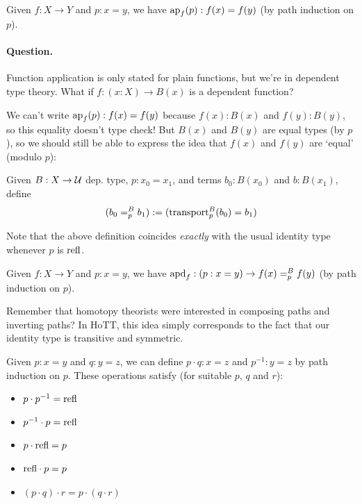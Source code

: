 \documentclass[10pt,oneside,leqno,openright]{memoir}
\begin{document}
\begin{example}
  Given $f :X \to Y$ and $p:x=y$, we have $\operatorname{ap}_f(p) : f(x) = f(y)$ (by path induction on $p$).
\end{example}

\paragraph{Question.} Function application is only stated for plain functions, but we're in dependent type theory. What if $f : (x:X) \to B(x)$ is a dependent function?

We can't write $\operatorname{ap}_f(p) : f(x) = f(y)$ because $f(x) : B(x)$ and $f(y):B(y)$, so this equality doesn't type check! But $B(x)$ and $B(y)$ are equal types (by $p$), so we should still be able to express the idea that $f(x)$ and $f(y)$ are `equal' (modulo $p$):

\begin{definition}
  Given $B: X \to \mathcal{U}$ dep. type, $p: x_0 = x_1$, and terms $b_0 : B(x_0)$ and $b:B(x_1)$, define
  \[(b_0 =^B_p b_1) := (\operatorname{transport}^B_p(b_0) = b_1) \]
\end{definition}

Note that the above definition coincides \emph{exactly} with the usual identity type whenever $p$ is $\mathrm{refl}$.

\begin{example}
  Given $f :X \to Y$ and $p:x=y$, we have $\operatorname{apd}_f : (p : x = y) \to f(x) =^B_p f(y)$ (by path induction on $p$).
\end{example}

Remember that homotopy theorists were interested in composing paths and inverting paths? In HoTT, this idea simply corresponds to the fact that our identity type is transitive and symmetric.

\begin{example}
  Given $p: x = y$ and $q:y = z$, we can define $p\cdot q : x = z$ and $p^{-1} : y = z$ by path induction on $p$. These operations satisfy (for suitable $p$, $q$ and $r$):
\begin{itemize}
\item $p \cdot p^{-1} = \mathrm{refl}$
\item $p^{-1} \cdot p = \mathrm{refl}$
\item $p \cdot \mathrm{refl} = p$
\item $\mathrm{refl} \cdot p = p$
\item $(p \cdot q) \cdot r = p \cdot (q \cdot r)$
\end{itemize}
 \end{example}
\end{document}
